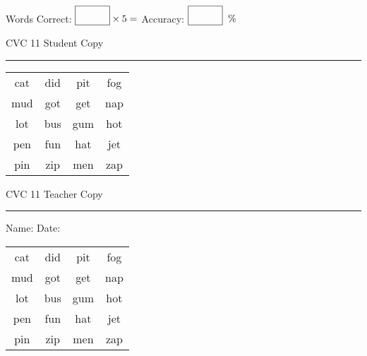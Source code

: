 \documentclass{memoir}
\begin{document}
\normalsize

Words Correct: $\fbox{\phantom{\huge 100}} \times 5 = $ Accuracy: $\fbox{\phantom{\huge 100}}\;\; \%$ 

\vfill

\newpage


\footnotesize \noindent
CVC 11 \hfill Student Copy
\smallskip
\hrule

\huge

\setlength{\tabcolsep}{14pt}
\def\arraystretch{2}

{\selectfont


\begin{vplace}[0.5]
\begin{center}
\begin{tabular}{cccc}
cat & did & pit & fog \\
mud & got & get & nap \\
lot & bus & gum  & hot \\
pen & fun & hat & jet \\
pin & zip & men & zap \\
\end{tabular}
\end{center}
\end{vplace}

}

\newpage

\footnotesize \noindent
CVC 11 \hfill Teacher Copy
\smallskip
\hrule

\normalsize

\vfill

\noindent
Name: \underline{\hspace{1.75in}} \hfill Date: \underline{\hspace{1in}}

\huge

{\selectfont


\begin{vplace}[0.5]
\begin{center}
\begin{tabular}{cccc}
cat & did & pit & fog \\
mud & got & get & nap \\
lot & bus & gum  & hot \\
pen & fun & hat & jet \\
pin & zip & men & zap \\
\end{tabular}
\end{center}
\end{vplace}



}
\end{document}
